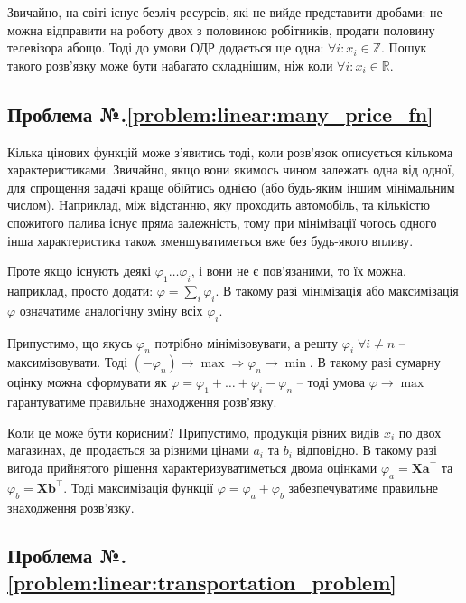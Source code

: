 \documentclass[\main/book.tex]{subfiles}
\begin{document}
Звичайно, на світі існує безліч ресурсів, які не вийде представити дробами: не можна відправити на роботу двох з половиною робітників, продати половину телевізора абощо. Тоді до умови ОДР додається ще одна: $\forall i: x_i \in \mathbb{Z}$. Пошук такого розв'язку може бути набагато складнішим, ніж коли $\forall i: x_i \in \mathbb{R}$.

\subsection*{Проблема №.\ref{problem:linear:many_price_fn}}

Кілька цінових функцій може з'явитись тоді, коли розв'язок описується кількома характеристиками. Звичайно, якщо вони якимось чином залежать одна від одної, для спрощення задачі краще обійтись однією (або будь-яким іншим мінімальним числом). Наприклад, між відстанню, яку проходить автомобіль, та кількістю спожитого палива існує пряма залежність, тому при мінімізації чогось одного інша характеристика також зменшуватиметься вже без будь-якого впливу.

Проте якщо існують деякі $\varphi_1 \ldots \varphi_i$, і вони не є пов'язаними, то їх можна, наприклад, просто додати: $\varphi = \sum_i \varphi_i$. В такому разі мінімізація або максимізація $\varphi$ означатиме аналогічну зміну всіх $\varphi_i$.

Припустимо, що якусь $\varphi_n$ потрібно мінімізовувати, а решту $\varphi_i \; \forall {i \neq n}$ -- максимізовувати. Тоді $(-\varphi_n) \rightarrow \max \Rightarrow \varphi_n \rightarrow \min$. В такому разі сумарну оцінку можна сформувати як $\varphi = \varphi_1 + \ldots + \varphi_i - \varphi_n$ -- тоді умова $\varphi \rightarrow \max$ гарантуватиме правильне знаходження розв'язку.

Коли це може бути корисним? Припустимо, продукція різних видів $x_i$ по двох магазинах, де продається за різними цінами $a_i$ та $b_i$ відповідно. В такому разі \flqq{}вигода\frqq{} прийнятого рішення характеризуватиметься двома оцінками $\varphi_a = \mathbf{X} \mathbf{a}^\top$ та $\varphi_b = \mathbf{X} \mathbf{b}^\top$. Тоді максимізація функції $\varphi = \varphi_a + \varphi_b$ забезпечуватиме правильне знаходження розв'язку.

\subsection*{Проблема №.\ref{problem:linear:transportation_problem}}
\end{document}
